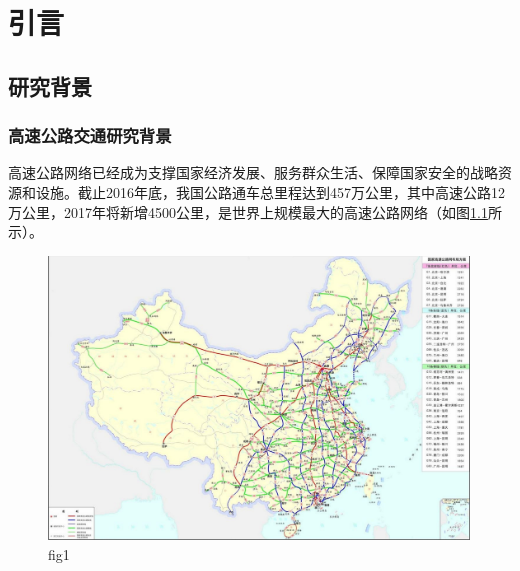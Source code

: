 
\chapter{引言}
\section{研究背景}
\subsection{高速公路交通研究背景}

高速公路网络已经成为支撑国家经济发展、服务群众生活、保障国家安全的战略资源和设施。截止2016年底，我国公路通车总里程达到457万公里，其中高速公路12万公里，2017年将新增4500公里，是世界上规模最大的高速公路网络（如图\ref{gaosugonglu}所示）。 

				\begin{figure}[h]
				\centering
						\begin{minipage}{0.8\linewidth}
							\centering
							\includegraphics[width=4.4in]{picture/gaosugonglu}
							\caption{fig1}
							\label{gaosugonglu}
						\end{minipage}%
				\end{figure}

